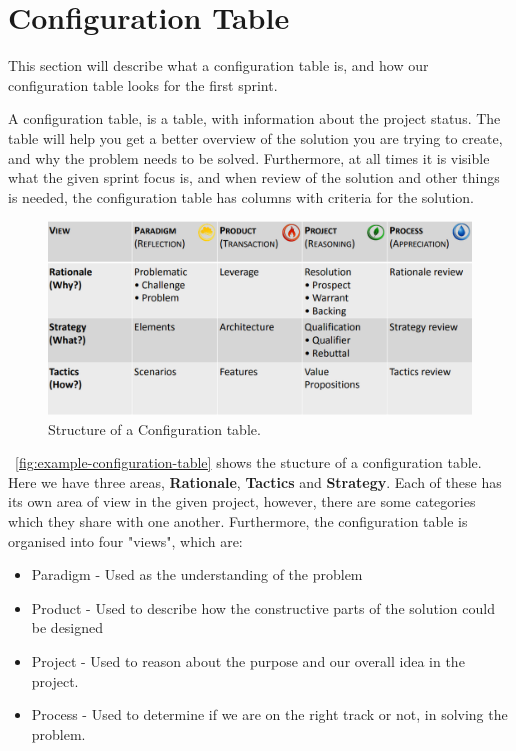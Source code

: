 \section{Configuration Table}\label{sec:first-configuration-table}
This section will describe what a configuration table is, and how our configuration table looks for the first sprint.

A configuration table, is a table, with information about the project status. 
The table will help you get a better overview of the solution you are trying to create, and why the problem needs to be solved.
Furthermore, at all times it is visible what the given sprint focus is, and when review of the solution and other things is needed, the configuration table has columns with criteria for the solution.


\begin{figure}[h]
    \centering
    \includegraphics[width=\linewidth]{images/configurationTableExample.png}
    \caption{Structure of a Configuration table.}
    \label{fig:example-configuration-table}
\end{figure}

~\autoref{fig:example-configuration-table} shows the stucture of a configuration table.
Here we have three areas, \textbf{Rationale}, \textbf{Tactics} and \textbf{Strategy}.
Each of these has its own area of view in the given project, however, there are some categories which they share with one another.
Furthermore, the configuration table is organised into four "views", which are:

\begin{itemize}
    \item Paradigm - Used as the understanding of the problem
    \item Product - Used to describe how the constructive parts of the solution could be designed
    \item Project - Used to reason about the purpose and our overall idea in the project.
    \item Process - Used to determine if we are on the right track or not, in solving the problem. 
\end{itemize}

